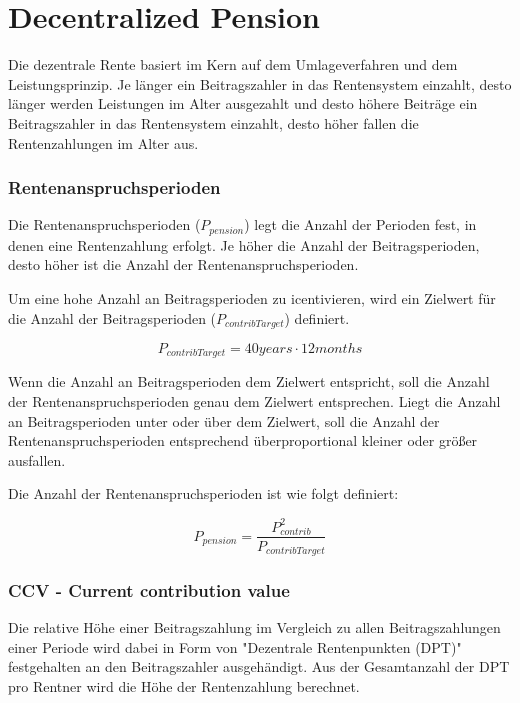 \section{Decentralized Pension}

Die dezentrale Rente basiert im Kern auf dem Umlageverfahren und dem Leistungsprinzip.
Je länger ein Beitragszahler in das Rentensystem einzahlt, desto länger werden Leistungen 
im Alter ausgezahlt und desto höhere Beiträge ein Beitragszahler in das Rentensystem
einzahlt, desto höher fallen die Rentenzahlungen im Alter aus.

\subsubsection*{Rentenanspruchsperioden}

Die Rentenanspruchsperioden ($P_{pension}$) legt die Anzahl der Perioden fest,
in denen eine Rentenzahlung erfolgt. Je höher die Anzahl der Beitragsperioden, desto höher ist die Anzahl der Rentenanspruchsperioden.

Um eine hohe Anzahl an Beitragsperioden zu icentivieren, wird ein Zielwert 
für die Anzahl der Beitragsperioden ($P_{contribTarget}$) definiert. 

\begin{equation*}
	P_{contribTarget} = 40 years \cdot 12 months
\end{equation*}

Wenn die Anzahl an Beitragsperioden dem Zielwert entspricht, soll die Anzahl der 
Rentenanspruchsperioden genau dem Zielwert entsprechen. Liegt die  Anzahl an
Beitragsperioden unter oder über dem Zielwert, soll die Anzahl der 
Rentenanspruchsperioden entsprechend überproportional kleiner oder größer ausfallen.  

Die Anzahl der Rentenanspruchsperioden ist wie folgt definiert:

\begin{equation*}
	P_{pension} = \frac{P_{contrib}^2}{P_{contribTarget}}
\end{equation*}


\subsubsection*{CCV - Current contribution value}

Die relative Höhe einer Beitragszahlung im Vergleich zu allen Beitragszahlungen einer 
Periode wird dabei in Form von "Dezentrale Rentenpunkten (DPT)" festgehalten an den 
Beitragszahler ausgehändigt. Aus der Gesamtanzahl der DPT pro Rentner wird die 
Höhe der Rentenzahlung berechnet.

